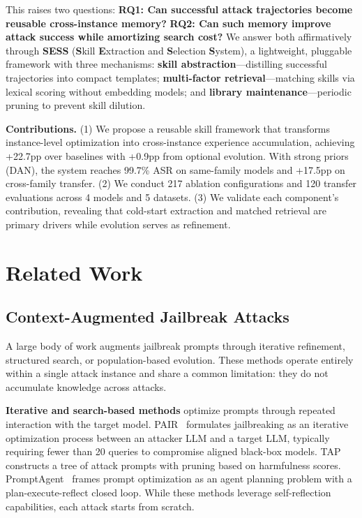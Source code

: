 \documentclass[letterpaper]{article}
\begin{document}
This raises two questions: \textbf{RQ1: Can successful attack trajectories become reusable cross-instance memory?} \textbf{RQ2: Can such memory improve attack success while amortizing search cost?} We answer both affirmatively through \textbf{SESS} (\textbf{S}kill \textbf{E}xtraction and \textbf{S}election \textbf{S}ystem), a lightweight, pluggable framework with three mechanisms: \textbf{skill abstraction}---distilling successful trajectories into compact templates; \textbf{multi-factor retrieval}---matching skills via lexical scoring without embedding models; and \textbf{library maintenance}---periodic pruning to prevent skill dilution.

\textbf{Contributions.} (1) We propose a reusable skill framework that transforms instance-level optimization into cross-instance experience accumulation, achieving +22.7pp over baselines with +0.9pp from optional evolution. With strong priors (DAN), the system reaches 99.7\% ASR on same-family models and +17.5pp on cross-family transfer. (2) We conduct 217 ablation configurations and 120 transfer evaluations across 4 models and 5 datasets. (3) We validate each component's contribution, revealing that cold-start extraction and matched retrieval are primary drivers while evolution serves as refinement.

\section{Related Work}

\subsection{Context-Augmented Jailbreak Attacks}

A large body of work augments jailbreak prompts through iterative refinement, structured search, or population-based evolution. These methods operate entirely within a single attack instance and share a common limitation: they do not accumulate knowledge across attacks.

\textbf{Iterative and search-based methods} optimize prompts through repeated interaction with the target model. PAIR~\citep{chao2023pair} formulates jailbreaking as an iterative optimization process between an attacker LLM and a target LLM, typically requiring fewer than 20 queries to compromise aligned black-box models. TAP~\citep{mehrotra2023tap} constructs a tree of attack prompts with pruning based on harmfulness scores. PromptAgent~\citep{wang2024promptagent} frames prompt optimization as an agent planning problem with a plan-execute-reflect closed loop. While these methods leverage self-reflection capabilities, each attack starts from scratch.
\end{document}
